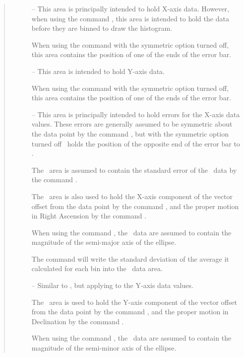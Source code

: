 \begin{quote}
\begin{description}
\item [\xcol] -- This area is principally intended to hold X-axis
data.  However, when using the command , this
area is intended to hold the data before they are binned to draw the
histogram.

When using the command  with the symmetric
option turned off, this area contains the position of one of the ends
of the error bar.

\item [\ycol] -- This area is intended to hold Y-axis data.

When using the command  with the symmetric
option turned off, this area contains the position of one of the ends
of the error bar.

\item [\excol] -- This area is principally intended to hold errors for the
X-axis data values.
These errors are generally assumed to be symmetric about the data point
by the command , but with the symmetric option turned off
\excol\ holds the position of the opposite end of the error bar to
\xcol.

The \excol\ area is assumed to contain the standard error of the \xcol\ data by
the command .

The \excol\ area is also used to hold the X-axis component of the
vector offset from the data point by the command ,
and the proper motion in Right Ascension by the command
.

When using the command , the \excol\ data are assumed
to contain the magnitude of the semi-major axis of the ellipse.

The command  will write the standard deviation of
the average it calculated for each bin into the \excol\ data area.

\item [\eycol] -- Similar to \excol, but applying to the Y-axis data values.

The \eycol\ area is used to hold the Y-axis component of the vector
offset from the data point by the command , and the
proper motion in Declination by the command .

When using the command , the \eycol\ data are assumed
to contain the magnitude of the semi-minor axis of the ellipse.


\end{description}
\end{quote}
